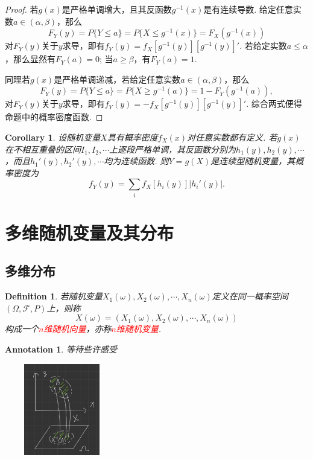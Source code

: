 \documentclass{article}
\newtheorem{corollary}[theorem]{Corollary}
\newtheorem{definition}[theorem]{Definition}
\newtheorem{annotation}[theorem]{Annotation}
\newcommand{\redt}[1]{\textcolor{red}{#1}}
\begin{document}
\begin{proof}
若$g(x)$是严格单调增大，且其反函数$g^{-1}(x)$是有连续导数. 给定任意实数$a \in (\alpha,\beta)$，那么
$$
F_Y(y) = P\{Y \leq a \} = P\{X \leq g^{-1}(x)\} = F_X(g^{-1}(x))
$$
对$F_Y(y)$关于$y$求导，即有$f_Y(y) = f_X\left[ g^{-1}(y) \right]\left[g^{-1}(y)\right]'$. 若给定实数$a \leq \alpha$，那么显然有$F_Y(a) = 0$; 当$a \geq \beta$，有$F_Y(a) = 1$.

同理若$g(x)$是严格单调递减，若给定任意实数$a \in (\alpha,\beta)$，那么
$$
F_Y(y) = P\{Y \leq a \} = P\{X \geq g^{-1}(a)\} = 1-F_Y(g^{-1}(a)), 
$$
对$F_Y(y)$关于$y$求导，即有$f_Y(y) = -f_X\left[ g^{-1}(y) \right]\left[g^{-1}(y)\right]'$. 综合两式便得命题中的概率密度函数. 
\end{proof}

\begin{corollary}
\rm 设随机变量$X$具有概率密度$f_X(x)$对任意实数都有定义. 若$g(x)$在不相互重叠的区间$I_1,I_2,\cdots$上逐段严格单调，其反函数分别为$h_1(y),h_2(y),\cdots$，而且$h_1'(y),h_2'(y),\cdots$均为连续函数. 则$Y=g(X)$是连续型随机变量，其概率密度为
$$
f_Y(y) = \sum\limits_{i}f_X\left[h_i(y)\right]|h_i'(y)|. 
$$
\end{corollary}


\newpage
\section{多维随机变量及其分布}

\subsection{多维分布}
\begin{definition}
\rm 若随机变量$X_1(\omega),X_2(\omega),\cdots,X_n(\omega)$定义在同一概率空间$(\Omega,\mathscr{F},P)$上，则称
$$
X(\omega) = (X_1(\omega),X_2(\omega),\cdots,X_n(\omega))
$$
构成一个\redt{$n$维随机向量}，亦称\redt{$n$维随机变量}.
\end{definition}

\begin{annotation}
\rm 等待些许感受
\begin{center}
\includegraphics[width=5cm, height=4cm]{images/random_vector.jpg}
\end{center}
\end{annotation}
\end{document}
